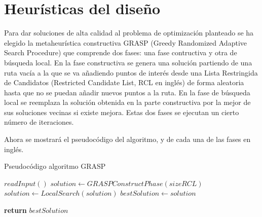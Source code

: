 \section[Heurísticas del diseño]{Heurísticas del diseño}
Para dar soluciones de alta calidad al problema de optimización planteado se ha elegido la metaheurística constructiva GRASP (Greedy Randomized Adaptive Search Procedure) que comprende dos fases: una fase contructiva y otra de búsqueda local. En la fase constructiva se genera una solución partiendo de una ruta vacía a la que se va añadiendo puntos de interés desde una Lista Restringida de Candidatos (Restricted Candidate List, RCL en inglés) de forma aleatoria hasta que no se puedan añadir nuevos puntos a la ruta. En la fase de búsqueda local se reemplaza la solución obtenida en la parte constructiva por la mejor de sus soluciones vecinas si existe mejora. Estas dos fases se ejecutan un cierto número de iteraciones.

Ahora se mostrará el pseudocódigo del algoritmo, y de cada una de las fases en inglés.
\vspace{0.06in}

\begin{algorithm}
	\caption{Pseudocódigo algoritmo GRASP}
	\label{alg:grasp}
\begin{algorithmic}
	\State $ readInput() $
		\State $ solution \gets GRASPConstructPhase(sizeRCL)$
		\State $ solution \gets LocalSearch(solution)$
			\State $ bestSolution \gets solution$
		\EndIf
	\EndFor
	
	\State \textbf{return} $bestSolution$
	\EndFunction
\end{algorithmic}
\end{algorithm}

